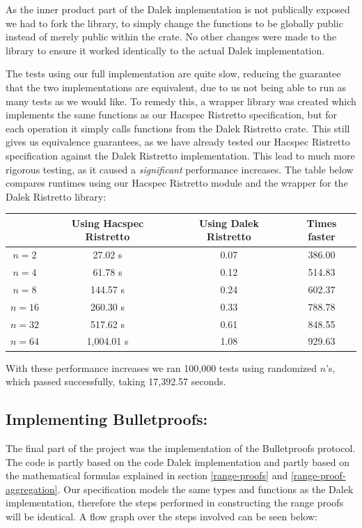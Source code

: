 \documentclass{article}
\begin{document}
As the inner product part of the Dalek implementation is not publically
exposed we had to fork the library, to simply change the functions to be
globally public instead of merely public within the crate. No other
changes were made to the library to ensure it worked identically to
the actual Dalek implementation.

The tests using our full implementation are quite slow, reducing the 
guarantee that the two implementations are equivalent, due to us not 
being able to run as many tests as we would like. To remedy this, 
a wrapper library was created which implements the same functions as 
our Hacspec Ristretto specification, but for each operation it simply 
calls functions from the Dalek Ristretto crate. This still gives us 
equivalence guarantees, as we have already tested our Hacspec Ristretto 
specification against the Dalek Ristretto implementation. This lead to 
much more rigorous testing, as it caused a \textit{significant} 
performance increases. The table below compares runtimes using our 
Hacspec Ristretto module and the wrapper for the Dalek Ristretto library:

\begin{center}
\begin{tabular}{ c|c|c|c } 
          & Using Hacspec Ristretto & Using Dalek Ristretto & Times faster \\ \hline\hline
 $n = 2$  & 27.02 s    & 0.07 & 386.00 \\ \hline
 $n = 4$  & 61.78 s    & 0.12 & 514.83 \\ \hline
 $n = 8$  & 144.57 s   & 0.24 & 602.37 \\ \hline
 $n = 16$ & 260.30 s   & 0.33 & 788.78 \\ \hline
 $n = 32$ & 517.62 s   & 0.61 & 848.55 \\ \hline
 $n = 64$ & 1,004.01 s & 1.08 & 929.63 \\ \hline
\end{tabular}
\end{center}

With these performance increases we ran 100,000 tests using
randomized $n$'s, which passed successfully, taking 17,392.57 seconds.

\subsection{Implementing Bulletproofs:} \label{implementing-bulletproofs}

The final part of the project was the implementation of the
Bulletproofs protocol. The code is partly based on the code Dalek
implementation and partly based on the mathematical formulas explained
in section \ref{range-proofs} and \ref{range-proof-aggregation}. Our
specification models the same types and functions as the Dalek
implementation, therefore the steps performed in constructing the range
proofs will be identical. A flow graph over the steps involved
can be seen below:
\end{document}
